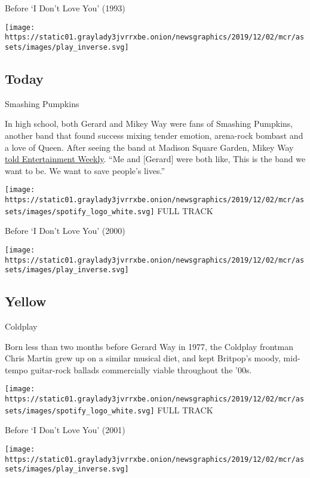 Before `I Don't Love You' (1993)

\texttt{[image: https://static01.graylady3jvrrxbe.onion/newsgraphics/2019/12/02/mcr/assets/images/play\_inverse.svg]}

\hypertarget{today}{%
\subsection{Today}\label{today}}

Smashing Pumpkins

In high school, both Gerard and Mikey Way were fans of Smashing
Pumpkins, another band that found success mixing tender emotion,
arena-rock bombast and a love of Queen. After seeing the band at Madison
Square Garden, Mikey Way
\href{https://ew.com/article/2006/12/01/transformation-my-chemical-romance/}{told
Entertainment Weekly}. ``Me and {[}Gerard{]} were both like, This is the
band we want to be. We want to save people's lives.''

\href{https://open.spotify.com/track/0u5aO1GYsIhAWCPuXdwnak?si=ylF4XDOGTmGQFMZQBTaVIA}{}

\texttt{[image: https://static01.graylady3jvrrxbe.onion/newsgraphics/2019/12/02/mcr/assets/images/spotify\_logo\_white.svg]}
FULL TRACK

Before `I Don't Love You' (2000)

\texttt{[image: https://static01.graylady3jvrrxbe.onion/newsgraphics/2019/12/02/mcr/assets/images/play\_inverse.svg]}

\hypertarget{yellow}{%
\subsection{Yellow}\label{yellow}}

Coldplay

Born less than two months before Gerard Way in 1977, the Coldplay
frontman Chris Martin grew up on a similar musical diet, and kept
Britpop's moody, mid-tempo guitar-rock ballads commercially viable
throughout the '00s.

\href{https://open.spotify.com/track/3AJwUDP919kvQ9QcozQPxg?si=TNFeTyxCSSqjHYyrctlbrA}{}

\texttt{[image: https://static01.graylady3jvrrxbe.onion/newsgraphics/2019/12/02/mcr/assets/images/spotify\_logo\_white.svg]}
FULL TRACK

Before `I Don't Love You' (2001)

\texttt{[image: https://static01.graylady3jvrrxbe.onion/newsgraphics/2019/12/02/mcr/assets/images/play\_inverse.svg]}

